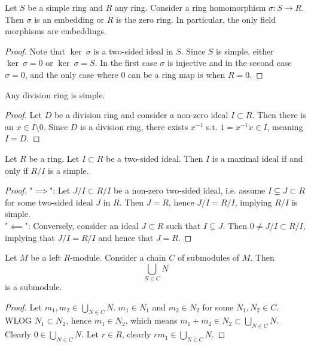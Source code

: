 \begin{lemma}
    Let $S$ be a simple ring and $R$ any ring. Consider a ring homomorphism $\sigma : S\rightarrow R$. Then $\sigma$ is an embedding or $R$ is the zero ring. In particular, the only field morphisms are embeddings. 
\end{lemma}
\begin{proof}
    Note that $\ker\ \sigma$ is a two-sided ideal in $S$. Since $S$ is simple, either $\ker\ \sigma=0$ or $\ker\ \sigma = S$. In the first case $\sigma$ is injective and in the second case $\sigma=0$, and the only case where $0$ can be a ring map is when $R=0$. 
\end{proof}
\begin{lemma}\label{DivisionRingsAreSimple}
    Any division ring is simple.
\end{lemma}
\begin{proof}
    Let $D$ be a division ring and consider a non-zero ideal $I\subset R$. Then there is an $x\in I\setminus 0$. Since $D$ is a division ring, there exists $x^{-1}$ s.t. $1 = x^{-1}x\in I$, meaning $I = D$.
\end{proof}
\begin{lemma}\label{MaximalIdealIffQuotientRingSimple}
    Let $R$ be a ring. Let $I\subset R$ be a two-sided ideal. Then $I$ is a maximal ideal if and only if $R/I$ is a simple.
\end{lemma}
\begin{proof}
    "$\implies$": Let $J/I\subset R/I$ be a non-zero two-sided ideal, i.e. assume $I\subsetneq J\subset R$ for some two-sided ideal $J$ in $R$. Then $J = R$, hence $J/I= R/I$, implying $R/I$ is simple.\\
    "$\impliedby$": Conversely, consider an ideal $J\subset R$ such that $I\subsetneq J$. Then $0\neq J/I\subset R/I$, implying that $J/I = R/I$ and hence that $J=R$. 
\end{proof}
\begin{lemma}\label{UnionOverChainOfSubmodulesIsSubmodule}
    Let $M$ be a left $R$-module. Consider a chain $C$ of submodules of $M$. Then 
    $$\bigcup_{N\in C} N$$
    is a submodule.
\end{lemma}
\begin{proof}
    Let $m_1,m_2\in \bigcup_{N\in C} N$. $m_1\in N_1$ and $m_2\in N_2$ for some $N_1,N_2\in C$. WLOG $N_1\subset N_2$, hence $m_1\in N_2$, which means $m_1+m_2\in N_2 \subset \bigcup_{N\in C} N$. Clearly $0\in \bigcup_{N\in C} N$. Let $r\in R$, clearly $rm_1\in \bigcup_{N\in C} N$.
\end{proof} 
